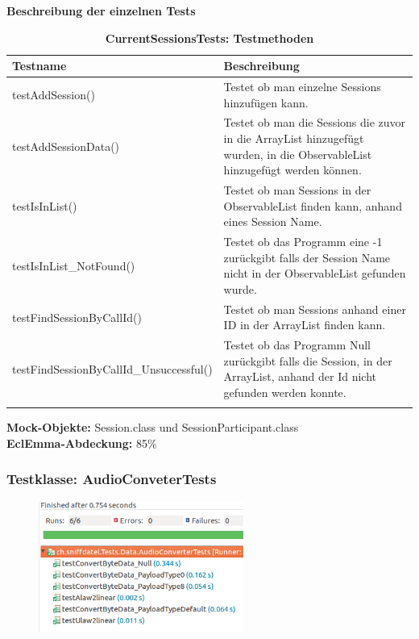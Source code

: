 \documentclass[a4,12pt]{scrartcl}
\begin{document}
\textbf{Beschreibung der einzelnen Tests}
\begin{longtable}{ p{7cm} p{7cm} }   
    {Testname} & {Beschreibung}\\ \midrule
    testAddSession() & Testet ob man einzelne Sessions hinzufügen kann.\\ \addlinespace
    testAddSessionData() & Testet ob man die Sessions die zuvor in die ArrayList hinzugefügt wurden, in die ObservableList hinzugefügt werden können.  \\ \addlinespace
    testIsInList() & Testet ob man Sessions in der ObservableList finden kann, anhand eines Session Name.\\ \addlinespace
    testIsInList\_NotFound() & Testet ob das Programm eine -1 zurückgibt falls der Session Name nicht in der ObservableList gefunden wurde. \\ \addlinespace
    testFindSessionByCallId() & Testet ob man Sessions anhand einer ID in der ArrayList finden kann.\\ \addlinespace
    testFindSessionByCallId\_Unsuccessful() & Testet ob das Programm Null zurückgibt falls die Session, in der ArrayList, anhand der Id nicht gefunden werden konnte. \\
\caption{\textbf{CurrentSessionsTests: Testmethoden}}
\end{longtable}

\noindent \textbf{Mock-Objekte:} Session.class und SessionParticipant.class\\
\textbf{EclEmma-Abdeckung:} 85\%

\subsubsection{Testklasse: AudioConveterTests}
\begin{figure} [H]
	\begin{center}
	\includegraphics[width=0.60\textwidth]{./pictures/AudioConverterTests.png}
	\label{Bild Referenz}
	\end{center}
\end{figure}
\end{document}
